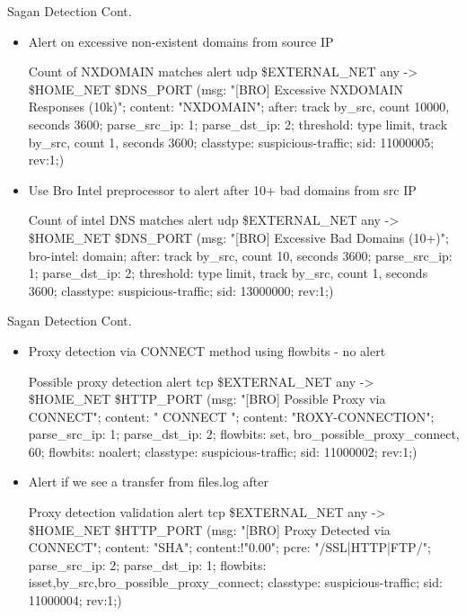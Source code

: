 \documentclass[xcolor=svgnames,handout]{beamer}
\begin{document}
\begin{frame}{Sagan Detection Cont.}
  \begin{itemize}
   \item Alert on excessive non-existent domains from source IP
    \begin{exampleblock}{Count of NXDOMAIN matches}
      \alert{alert udp \$EXTERNAL\_NET any -> \$HOME\_NET \$DNS\_PORT  (msg: "[BRO]
        Excessive NXDOMAIN Responses (10k)";  content: "NXDOMAIN"; after: track
        by\_src, count 10000, seconds 3600; parse\_src\_ip: 1; parse\_dst\_ip: 2;
        threshold: type limit, track by\_src, count 1, seconds 3600; classtype: suspicious-traffic; sid: 11000005; rev:1;)}
    \end{exampleblock}
    \item Use Bro Intel preprocessor to alert after 10+ bad domains from src IP
    \begin{exampleblock}{Count of intel DNS matches}
      \alert{alert udp \$EXTERNAL\_NET any -> \$HOME\_NET \$DNS\_PORT (msg: "[BRO] Excessive
        Bad Domains (10+)"; bro-intel: domain; after: track by\_src, count 10,
        seconds 3600; parse\_src\_ip: 1; parse\_dst\_ip: 2; threshold: type
        limit, track by\_src, count 1, seconds 3600; classtype: suspicious-traffic; sid: 13000000; rev:1;)}
    \end{exampleblock}
  \end{itemize}
\end{frame}


\begin{frame}{Sagan Detection Cont.}
  \begin{itemize}
   \item Proxy detection via CONNECT method using flowbits - no alert
    \begin{exampleblock}{Possible proxy detection}
      \alert{alert tcp \$EXTERNAL\_NET any -> \$HOME\_NET \$HTTP\_PORT (msg: "[BRO] Possible
      Proxy via CONNECT"; content: " CONNECT "; content: "ROXY-CONNECTION";
      parse\_src\_ip: 1; parse\_dst\_ip: 2; flowbits: set, bro\_possible\_proxy\_connect, 60;
      flowbits: noalert; classtype: suspicious-traffic; sid: 11000002; rev:1;)}
    \end{exampleblock}
   \item Alert if we see a transfer from files.log after
    \begin{exampleblock}{Proxy detection validation}
      \alert{alert tcp \$EXTERNAL\_NET any -> \$HOME\_NET \$HTTP\_PORT (msg: "[BRO] Proxy
        Detected via CONNECT"; content: "SHA"; content:!"0.00"; pcre:
        "/SSL|HTTP|FTP/"; parse\_src\_ip: 2; parse\_dst\_ip: 1; flowbits:
        isset,by\_src,bro\_possible\_proxy\_connect; classtype: suspicious-traffic; sid: 11000004; rev:1;)}
    \end{exampleblock}
  \end{itemize}
\end{frame}
\end{document}
